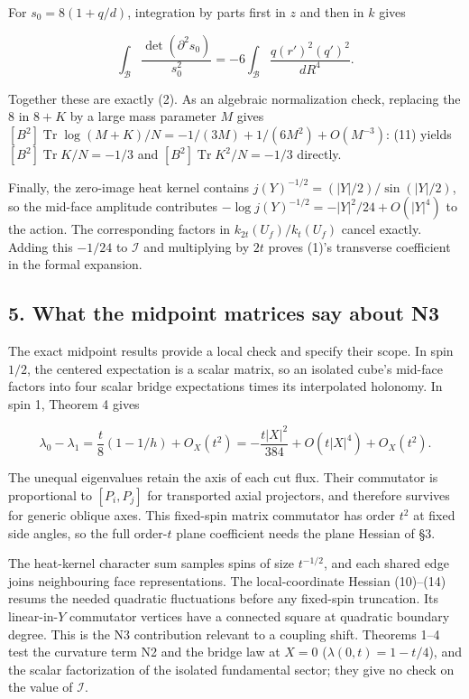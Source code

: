 \documentclass[11pt,a4paper]{article}
\begin{document}
For \(s_0=8(1+q/d)\), integration by parts first in \(z\) and then in
\(k\) gives

\[\int_{\mathcal B}\frac{\det(\partial^2s_0)}{s_0^2}
=-6\int_{\mathcal B}\frac{q(r')^2(q')^2}{dR^4}.\]

Together these are exactly (2). As an algebraic normalization check,
replacing the 8 in \(8+K\) by a large mass parameter \(M\) gives
\([B^2]\operatorname{Tr}\log(M+K)/N =-1/(3M)+1/(6M^2)+O(M^{-3})\): (11)
yields \([B^2]\operatorname{Tr}K/N=-1/3\) and
\([B^2]\operatorname{Tr}K^2/N=-1/3\) directly.

Finally, the zero-image heat kernel contains
\(j(Y)^{-1/2}=(|Y|/2)/\sin(|Y|/2)\), so the mid-face amplitude
contributes \(-\log j(Y)^{-1/2}=-|Y|^2/24+O(|Y|^4)\) to the action. The
corresponding factors in \(k_{2t}(U_f)/k_t(U_f)\) cancel exactly. Adding
this \(-1/24\) to \(\mathcal I\) and multiplying by \(2t\) proves (1)'s
transverse coefficient in the formal expansion.

\hypertarget{what-the-midpoint-matrices-say-about-n3}{%
\subsection{5. What the midpoint matrices say about
N3}\label{what-the-midpoint-matrices-say-about-n3}}

The exact midpoint results provide a local check and specify their
scope. In spin \(1/2\), the centered expectation is a scalar matrix, so
an isolated cube's mid-face factors into four scalar bridge expectations
times its interpolated holonomy. In spin 1, Theorem 4 gives

\[\lambda_0-\lambda_1
=\frac t8(1-1/h)+O_X(t^2)
=-\frac{t|X|^2}{384}+O(t|X|^4)+O_X(t^2).\]

The unequal eigenvalues retain the axis of each cut flux. Their
commutator is proportional to \([P_i,P_j]\) for transported axial
projectors, and therefore survives for generic oblique axes. This
fixed-spin matrix commutator has order \(t^2\) at fixed side angles, so
the full order-\(t\) plane coefficient needs the plane Hessian of §3.

The heat-kernel character sum samples spins of size \(t^{-1/2}\), and
each shared edge joins neighbouring face representations. The
local-coordinate Hessian (10)--(14) resums the needed quadratic
fluctuations before any fixed-spin truncation. Its linear-in-\(Y\)
commutator vertices have a connected square at quadratic boundary
degree. This is the N3 contribution relevant to a coupling shift.
Theorems 1--4 test the curvature term N2 and the bridge law at \(X=0\)
(\(\lambda(0,t)=1-t/4\)), and the scalar factorization of the isolated
fundamental sector; they give no check on the value of \(\mathcal I\).
\end{document}
